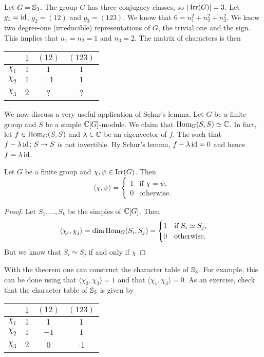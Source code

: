\begin{example}
\label{exa:S3}
    Let $G=\mathbb{S}_3$. The group $G$ has three conjugacy classes, so
    $|\operatorname{Irr}(G)|=3$. Let $g_1=\operatorname{id}$, $g_2=(12)$ and $g_3=(123)$. We 
    know that $6=n_1^2+n_2^2+n_3^2$. We know two degree-one
    (irreducible) representations of $G$, the trivial one and
    the sign. This implies that $n_1=n_2=1$ and 
    $n_3=2$. 
    The matrix of characters is then
    \begin{center}
		\begin{tabular}{|c|ccc|}
			\hline
			& $1$ & $(12)$ & $(123)$ \tabularnewline
			\hline 
			$\chi_{1}$ & $1$ & $1$ & $1$\tabularnewline
			$\chi_{2}$ & $1$ & $-1$ & $1$ \tabularnewline
			$\chi_{3}$ & $2$ & ? & ? \tabularnewline
			\hline
		\end{tabular}
	\end{center}
\end{example}

We now discuss a very useful application of Schur's lemma. 
Let $G$ be a finite group and $S$ be a simple $\mathbb{C}[G]$-module.
We claim that $\operatorname{Hom}_G(S,S)\simeq\mathbb{C}$. In fact, let 
$f\in\operatorname{Hom}_G(S,S)$ and $\lambda\in\mathbb{C}$ be an eigenvector of $f$. The such that 
$f-\lambda\operatorname{id}\colon S\to S$ is not invertible. By Schur's lemma, 
$f-\lambda\operatorname{id}=0$ and hence $f=\lambda\operatorname{id}$. 

\begin{theorem}[Schur]
    Let $G$ be a finite group and $\chi,\psi\in\operatorname{Irr}(G)$. Then
    \[
    \langle\chi,\psi\rangle=\begin{cases}
    1 & \text{if $\chi=\psi$,}\\
    0 & \text{otherwise.}
    \end{cases}
    \]
\end{theorem}

\begin{proof}
    Let $S_1,\dots,S_k$ be the simples of $\mathbb{C}[G]$. Then 
    \[
    \langle\chi_i,\chi_j\rangle=\dim\operatorname{Hom}_G(S_i,S_j)
    =\begin{cases}
    1 & \text{if $S_i\simeq S_j$},\\
    0 & \text{otherwise.}
    \end{cases}
    \]
    But we know that $S_i\simeq S_j$ if and only if 
    $\chi$
\end{proof}

With the theorem one can construct the character table of $\mathbb{S}_3$.
For example, this can be done using that $\langle\chi_3,\chi_3\rangle=1$ 
and that $\langle\chi_1,\chi_3\rangle=0$. 
As an exercise, check that the character table of $\mathbb{S}_3$ 
is given by
    \begin{center}
		\begin{tabular}{|c|ccc|}
			\hline
			& $1$ & $(12)$ & $(123)$ \tabularnewline
			\hline 
			$\chi_{1}$ & $1$ & $1$ & $1$\tabularnewline
			$\chi_{2}$ & $1$ & $-1$ & $1$ \tabularnewline
			$\chi_{3}$ & $2$ & 0 & -1 \tabularnewline
			\hline
		\end{tabular}
	\end{center}
	
